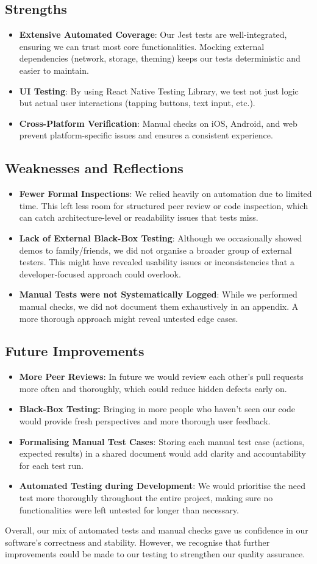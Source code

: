 \subsection{Strengths} \begin{itemize} \item \textbf{Extensive Automated Coverage}: Our Jest tests are well-integrated, ensuring we can trust most core functionalities. Mocking external dependencies (network, storage, theming) keeps our tests deterministic and easier to maintain. \item \textbf{UI Testing}: By using React Native Testing Library, we test not just logic but actual user interactions (tapping buttons, text input, etc.). \item \textbf{Cross-Platform Verification}: Manual checks on iOS, Android, and web prevent platform-specific issues and ensures a consistent experience. \end{itemize}

\subsection{Weaknesses and Reflections} \begin{itemize} \item \textbf{Fewer Formal Inspections}: We relied heavily on automation due to limited time. This left less room for structured peer review or code inspection, which can catch architecture-level or readability issues that tests miss. \item \textbf{Lack of External Black-Box Testing}: Although we occasionally showed demos to family/friends, we did not organise a broader group of external testers. This might have revealed usability issues or inconsistencies that a developer-focused approach could overlook. \item \textbf{Manual Tests were not Systematically Logged}: While we performed manual checks, we did not document them exhaustively in an appendix. A more thorough approach might reveal untested edge cases. \end{itemize}

\subsection{Future Improvements} \begin{itemize} \item \textbf{More Peer Reviews}: In future we would review each other’s pull requests more often and thoroughly, which could reduce hidden defects early on. \item \textbf{Black-Box Testing:} Bringing in more people who haven’t seen our code would provide fresh perspectives and more thorough user feedback. \item \textbf{Formalising Manual Test Cases}: Storing each manual test case (actions, expected results) in a shared document would add clarity and accountability for each test run.
\item \textbf{Automated Testing during Development}: We would prioritise the need test more thoroughly throughout the entire project, making sure no functionalities were left untested for longer than necessary.\end{itemize}

\noindent Overall, our mix of automated tests and manual checks gave us confidence in our software’s correctness and stability. However, we recognise that further improvements could be made to our testing to strengthen our quality assurance.